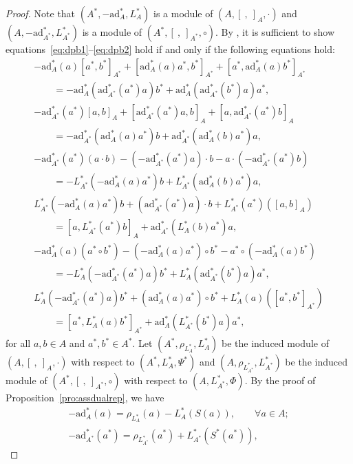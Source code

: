\documentclass[pdftex]{sigma}
\numberwithin{equation}{section}
\newcommand{\ad}{\mathrm{ad}}
\begin{document}
\begin{proof}
	Note that $(A^*, -\ad_A^*, L_A^*)$ is a module of $(A, [\ ,\ ]_A, \cdot)$ and $(A, -\ad_{A^*}^*, L_{A^*}^*)$ is a module of $(A^*, [\ ,\ ]_{A^*}, \circ)$. By \cite[Theorem 1]{ni2013poisson}, it is sufficient to show equations~\eqref{eq:dpb1}--\eqref{eq:dpb2} hold if and only if the following equations hold:
 \begin{gather}
 -\ad_A^*(a)[a^*, b^*]_{A^*} + [\ad_A^*(a)a^*, b^*]_{A^*} + [a^*, \ad_A^*(a)b^*]_{A^*} \nonumber\\
 \qquad{}= - \ad_A^*(\ad_{A^*}^*(a^*)a) b^* + \ad_A^*(\ad_{A^*}^*(b^*)a) a^*, \label{eq:matlie1}\\
 -\ad_{A^*}^*(a^*)[a, b]_A + [\ad_{A^*}^*(a^*)a, b]_A + [a, \ad_{A^*}^*(a^*)b]_A \nonumber\\
\qquad{} = - \ad_{A^*}^*(\ad_A^*(a)a^*) b + \ad_{A^*}^*(\ad_A^*(b)a^*) a, \label{eq:matlie2} \\
 -\ad_{A^*}^*(a^*)(a \cdot b) - (-\ad_{A^*}^*(a^*) a) \cdot b - a \cdot (-\ad_{A^*}^*(a^*) b)\nonumber \\
 \qquad{} = - L_{A^*}^*(-\ad_A^*(a)a^*)b + L_{A^*}^*(\ad_A^*(b)a^*) a, \label{eq:matpoi1} \\
 L_{A^*}^*(-\ad_A^*(a)a^*)b + (\ad_{A^*}^*(a^*)a)\cdot b + L_{A^*}^*(a^*)([a, b]_A) \nonumber\\
\qquad{} = [a, L_{A^*}^*(a^*)b]_A + \ad_{A^*}^*(L_A^*(b)a^*)a, \label{eq:matpoi2} \\
 -\ad_A^*(a)(a^* \circ b^*) - (-\ad_A^*(a)a^*) \circ b^* - a^* \circ (-\ad_A^*(a)b^*) \nonumber\\
\qquad{} = - L_A^*(-\ad_{A^*}^*(a^*)a)b^* + L_A^*(\ad_{A^*}^*(b^*)a)a^*, \label{eq:matpoi3}\\
 L_A^*(-\ad_{A^*}^*(a^*)a)b^* + (\ad_A^*(a)a^*) \circ b^* + L_A^*(a)([a^*,b^*]_{A^*}) \nonumber \\
\qquad{} = [a^*, L_A^*(a)b^*]_{A^*} + \ad_A^*(L_{A^*}^*(b^*)a)a^*, \label{eq:matpoi4}
 \end{gather}
 for all $a, b \in A$ and $a^*, b^* \in A^*$. Let $(A^*,\rho_{L_A^*}, L_A^*)$ be the induced module of $(A, [\ ,\ ]_A, \cdot)$ with respect to $(A^*,L_A^*, \Psi^*)$ and $(A,\rho_{L_{A^*}^*}, L_{A^*}^*)$ be the induced module of $(A^*, [\ ,\ ]_{A^*}, \circ)$ with respect to $(A, L_{A^*}^*, \Phi)$.
 By the proof of Proposition~\ref{pro:assdualrep}, we have
 \begin{gather*}
 -\ad^*_A(a) = \rho_{L^*_A}(a) - L^*_A(S(a)),\qquad
 \forall a \in A; \\
 -\ad^*_{A^*}(a^*) = \rho_{L^*_{A^*}}(a^*) + L^*_{A^*}(S^*(a^*)), \qquad

\end{gather*}
\end{proof}
\end{document}
